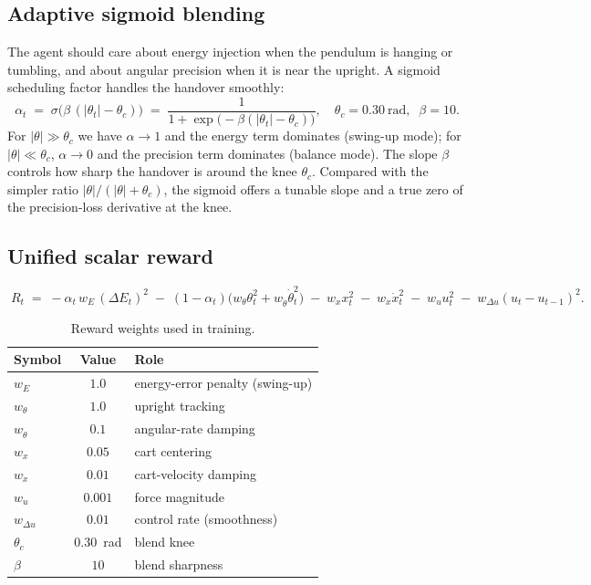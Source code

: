 \documentclass[11pt,a4paper]{article}
\begin{document}
\subsection{Adaptive sigmoid blending}
The agent should care about energy injection when the pendulum is hanging or tumbling, and about angular precision when it is near the upright. A sigmoid scheduling factor handles the handover smoothly:
\begin{equation}
\boxed{\;
\alpha_t \;=\; \sigma\!\bigl(\beta\,(\lvert\theta_t\rvert - \theta_c)\bigr)
       \;=\; \frac{1}{1 + \exp\bigl(-\beta(\lvert\theta_t\rvert - \theta_c)\bigr)},
\quad \theta_c = 0.30~\text{rad},\;\; \beta = 10.
\;}
\end{equation}
For $\lvert\theta\rvert \gg \theta_c$ we have $\alpha \to 1$ and the energy term dominates (swing-up mode); for $\lvert\theta\rvert \ll \theta_c$, $\alpha \to 0$ and the precision term dominates (balance mode). The slope $\beta$ controls how sharp the handover is around the knee $\theta_c$. Compared with the simpler ratio $\lvert\theta\rvert / (\lvert\theta\rvert + \theta_c)$, the sigmoid offers a tunable slope and a true zero of the precision-loss derivative at the knee.

\subsection{Unified scalar reward}
\begin{equation}
\boxed{\;
R_t \;=\; -\alpha_t\, w_E\,(\Delta E_t)^2
       \;-\; (1-\alpha_t)\bigl(w_\theta\theta_t^2 + w_{\dot\theta}\dot\theta_t^2\bigr)
       \;-\; w_x x_t^2 \;-\; w_{\dot x}\dot{x}_t^2
       \;-\; w_u u_t^2 \;-\; w_{\Delta u}(u_t - u_{t-1})^2.
\;}
\label{eq:reward}
\end{equation}

\begin{table}[h]
\centering
\caption{Reward weights used in training.}
\label{tab:weights}
\begin{tabular}{lcl}
\toprule
\textbf{Symbol} & \textbf{Value} & \textbf{Role} \\
\midrule
$w_E$           & $1.0$   & energy-error penalty (swing-up) \\
$w_\theta$      & $1.0$   & upright tracking \\
$w_{\dot\theta}$ & $0.1$  & angular-rate damping \\
$w_x$           & $0.05$  & cart centering \\
$w_{\dot x}$    & $0.01$  & cart-velocity damping \\
$w_u$           & $0.001$ & force magnitude \\
$w_{\Delta u}$  & $0.01$  & control rate (smoothness) \\
$\theta_c$      & $0.30$~rad & blend knee \\
$\beta$         & $10$    & blend sharpness \\
\bottomrule
\end{tabular}
\end{table}
\end{document}
